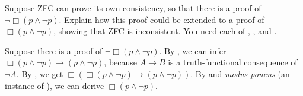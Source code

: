 \begin{exercise}
  Suppose ZFC can prove its own consistency, so that there is a proof of
  $\neg \Box (p \land \neg p)$. Explain how this proof could be extended to a
  proof of $\Box (p \land \neg p)$, showing that ZFC is inconsistent. You need
  each of , , and .
\end{exercise}
\begin{solution}
  Suppose there is a proof of $\neg\Box (p \land \neg p)$. By , we can
  infer $\Box (p \land \neg p) \to (p \land \neg p)$, because $A \to B$ is a
  truth-functional consequence of $\neg A$. By , we get
  $\Box (\Box (p \land \neg p) \to (p \land \neg p))$. By  and
  \emph{modus ponens} (an instance of ), we can derive
  $\Box (p \land \neg p)$.
\end{solution}


%
%

